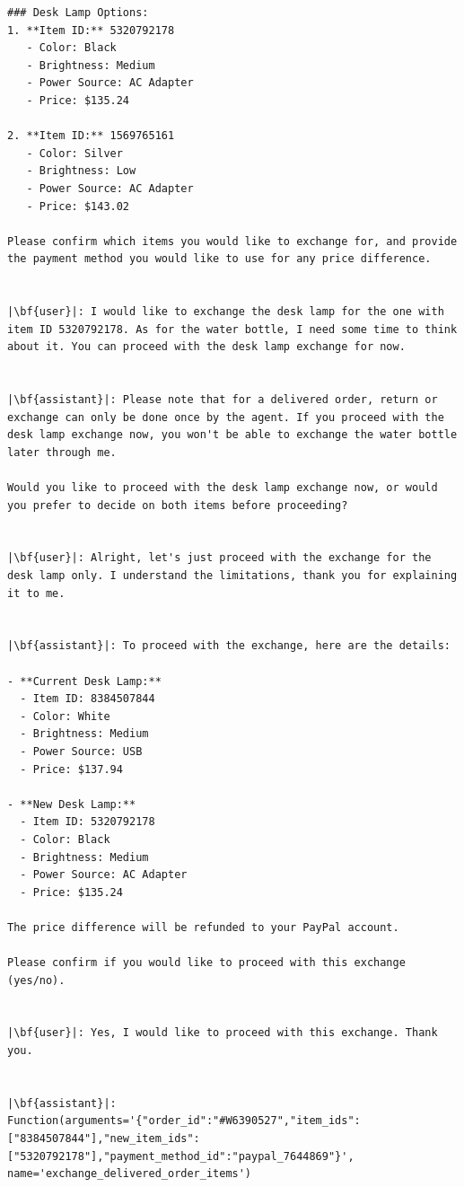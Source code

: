 \begin{longlisting}
\begin{verbatim}
### Desk Lamp Options:
1. **Item ID:** 5320792178
   - Color: Black
   - Brightness: Medium
   - Power Source: AC Adapter
   - Price: $135.24

2. **Item ID:** 1569765161
   - Color: Silver
   - Brightness: Low
   - Power Source: AC Adapter
   - Price: $143.02

Please confirm which items you would like to exchange for, and provide the payment method you would like to use for any price difference.


|\bf{user}|: I would like to exchange the desk lamp for the one with item ID 5320792178. As for the water bottle, I need some time to think about it. You can proceed with the desk lamp exchange for now.


|\bf{assistant}|: Please note that for a delivered order, return or exchange can only be done once by the agent. If you proceed with the desk lamp exchange now, you won't be able to exchange the water bottle later through me.

Would you like to proceed with the desk lamp exchange now, or would you prefer to decide on both items before proceeding?


|\bf{user}|: Alright, let's just proceed with the exchange for the desk lamp only. I understand the limitations, thank you for explaining it to me.


|\bf{assistant}|: To proceed with the exchange, here are the details:

- **Current Desk Lamp:**
  - Item ID: 8384507844
  - Color: White
  - Brightness: Medium
  - Power Source: USB
  - Price: $137.94

- **New Desk Lamp:**
  - Item ID: 5320792178
  - Color: Black
  - Brightness: Medium
  - Power Source: AC Adapter
  - Price: $135.24

The price difference will be refunded to your PayPal account.

Please confirm if you would like to proceed with this exchange (yes/no).


|\bf{user}|: Yes, I would like to proceed with this exchange. Thank you.


|\bf{assistant}|: Function(arguments='{"order_id":"#W6390527","item_ids":["8384507844"],"new_item_ids":["5320792178"],"payment_method_id":"paypal_7644869"}', name='exchange_delivered_order_items')



\end{verbatim}
\end{longlisting}
